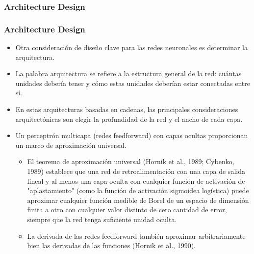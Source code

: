 \documentclass[
  shownotes,
  xcolor={svgnames},
  hyperref={colorlinks,citecolor=DarkBlue,linkcolor=DarkRed,urlcolor=DarkBlue}
  , aspectratio=169]{beamer}
\begin{document}
\subsubsection{Architecture Design}
\begin{frame}
\frametitle{Architecture Design}

\begin{itemize}


\item Otra consideración de diseño clave para las redes neuronales es determinar la arquitectura.

\item La palabra arquitectura se refiere a la estructura general de la red: cuántas unidades debería tener y cómo estas unidades deberían estar conectadas entre sí.

\item En estas arquitecturas basadas en cadenas, las principales consideraciones arquitectónicas son elegir la profundidad de la red y el ancho de cada capa.

\item Un perceptrón multicapa (redes feedforward) con capas ocultas proporcionan un marco de aproximación universal. 
\begin{itemize}
\item El teorema de aproximación universal (Hornik et al., 1989; Cybenko, 1989) establece que una red de retroalimentación con una capa de salida lineal y al menos una capa oculta con cualquier función de activación de "aplastamiento" (como la función de activación sigmoidea logística) puede aproximar cualquier función medible de Borel de un espacio de dimensión finita a otro con cualquier valor distinto de cero cantidad de error, siempre que la red tenga suficiente unidad oculta.

\item La derivada de las redes feedforward también aproximar arbitrariamente bien las derivadas de las funciones (Hornik et al., 1990). 
\end{itemize}



\end{itemize}

\end{frame}
\end{document}
